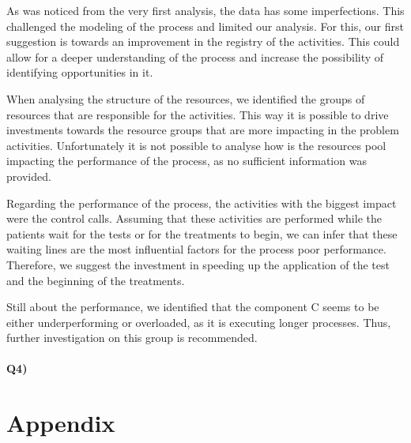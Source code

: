 \documentclass[12pt]{report}
\begin{document}
As was noticed from the very first analysis, the data has some imperfections. This challenged the modeling of the process and limited our analysis. For this, our first suggestion is towards an improvement in the registry of the activities. This could allow for a deeper understanding of the process and increase the possibility of identifying opportunities in it.

When analysing the structure of the resources, we identified the groups of resources that are responsible for the activities. This way it is possible to drive investments towards the resource groups that are more impacting in the problem activities. Unfortunately it is not possible to analyse how is the resources pool impacting the performance of the process, as no sufficient information was provided.

Regarding the performance of the process, the activities with the biggest impact were the control calls. Assuming that these activities are performed while the patients wait for the tests or for the treatments to begin, we can infer that these waiting lines are the most influential factors for the process poor performance. Therefore, we suggest the investment in speeding up the application of the test and the beginning of the treatments.

Still about the performance, we identified that the component C seems to be either underperforming or overloaded, as it is executing longer processes. Thus, further investigation on this group is recommended.

\paragraph{Q4)} 

\newpage
    
\section*{Appendix}
\end{document}
